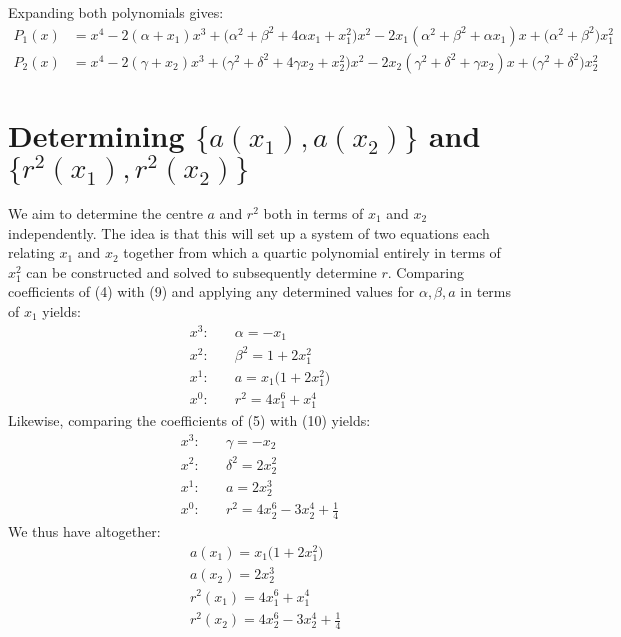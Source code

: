 \documentclass{article}
\begin{document}
Expanding both polynomials gives:
\begin{align*}
\tag{9}P_1(x) &= x^4 - 2(\alpha + x_1)x^3 + \big(\alpha^2 + \beta^2 + 4\alpha x_1 + x_1^2\big)x^2- 2x_1(\alpha^2 + \beta^2 + \alpha x_1)x + \big(\alpha^2 + \beta^2\big)x_1^2 \\
\tag{10}P_2(x) &= x^4 - 2(\gamma + x_2)x^3 + \big(\gamma^2 + \delta^2 + 4\gamma x_2 + x_2^2\big)x^2 - 2x_2(\gamma^2 + \delta^2 + \gamma x_2)x + \big(\gamma^2 + \delta^2\big)x_2^2
\end{align*}
\section{Determining $\{a(x_1),a(x_2)\}$ and $\{r^2(x_1),r^2(x_2)\}$}
We aim to determine the centre $a$ and $r^2$ both in terms of $x_1$ and $x_2$ independently. The idea is that this will set up a system of two equations each relating $x_1$ and $x_2$ together from which a quartic polynomial entirely in terms of $x_1^2$ can be constructed and solved to subsequently determine $r$.  
\newline\newline
Comparing coefficients of (4) with (9) and applying any determined values for $\alpha,\beta,a$ in terms of $x_1$ yields:
\begin{align*}
x^3\!:\!&\quad \alpha = -x_1 \\
x^2\!:\!&\quad \beta^2 = 1 + 2x_1^2 \\
x^1\!:\!&\quad a = x_1\big(1 + 2x_1^2\big) \\
x^0\!:\!&\quad r^2=4x_1^6+x_1^4
\end{align*}
\noindent Likewise, comparing the coefficients of (5) with (10) yields:
\begin{align*}
x^3\!:\!&\quad \gamma =-x_2 \\
x^2\!:\!&\quad \delta^2=2x_2^2 \\
x^1\!:\!&\quad a = 2x_2^3 \\
x^0\!:\!&\quad r^2=4x_2^6-3x_2^4+\frac{1}{4}
\end{align*}
We thus have altogether:
\begin{align*}
    \tag{11} &a(x_1) =x_1\big(1+2x_1^2\big) \\
    \tag{12} &a(x_2) = 2x_2^3 \\
    \tag{13} &r^2(x_1)=4x_1^6+x_1^4 \\
    \tag{14}&r^2(x_2)=4x_2^6-3x_2^4+\frac{1}{4}
\end{align*}
\end{document}
